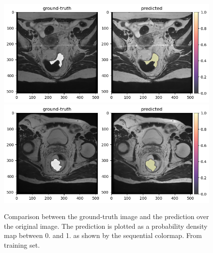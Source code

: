 \documentclass{standalone}
\begin{document}
\begin{figure}[htp]

    \centering
    \includegraphics[width=\textwidth]{../images/predoutputoverlap2.png}
    \includegraphics[width=\textwidth]{../images/predoutputoverlap1.png}
    
    \caption{Comparison between the ground-truth image and the prediction over the original image.
    The prediction is plotted as a probability density map between 0. and 1. as shown by the sequential colormap.
    From training set.}\label{predoverlaptraining}

\end{figure}
\end{document}
